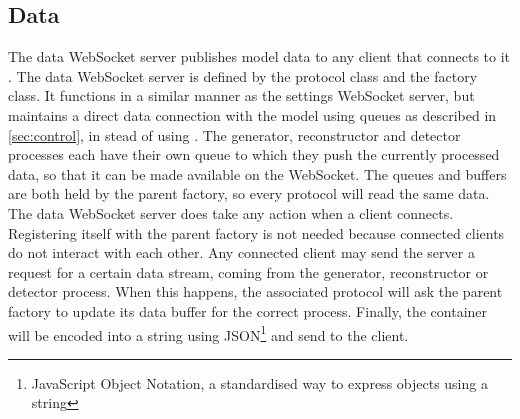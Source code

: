 \documentclass[a4paper, openany, oneside]{memoir}
\begin{document}
\subsection{Data}
\label{sub:websocket_data}
The data WebSocket server publishes model data to any client that connects to it . The data WebSocket server is defined by the  protocol class and the  factory class. It functions in a similar manner as the settings WebSocket server, but maintains a direct data connection with the model using queues as described in \cref{sec:control}, in stead of using . The generator, reconstructor and detector processes each have their own queue to which they push the currently processed data, so that it can be made available on the WebSocket. The queues and buffers are both held by the parent factory, so every protocol will read the same data.
The data WebSocket server does take any action when a client connects. Registering itself with the parent factory is not needed because connected clients do not interact with each other.
Any connected client may send the server a request for a certain data stream, coming from the generator, reconstructor or detector process.
When this happens, the associated protocol will ask the parent factory to update its data buffer for the correct process. Finally, the container will be encoded into a string using JSON\footnote{JavaScript Object Notation, a standardised way to express objects using a string} and send to the client.
\end{document}
